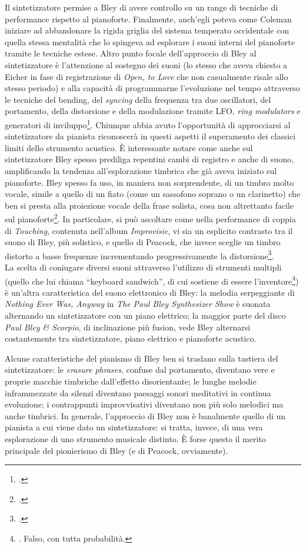 Il sintetizzatore permise a Bley di avere controllo su un range di tecniche di performance rispetto al pianoforte. Finalmente, anch'egli poteva come Coleman iniziare ad abbandonare la rigida griglia del sistema temperato occidentale con quella stessa mentalità che lo spingeva ad esplorare i suoni interni del pianoforte tramite le tecniche estese. Altro punto focale dell'approccio di Bley al sintetizzatore è l'attenzione al sostegno dei suoni (lo stesso che aveva chiesto a Eicher in fase di registrazione di \textit{Open, to Love} che non casualmente risale allo stesso periodo) e alla capacità di programmarne l'evoluzione nel tempo attraverso le tecniche del bending, del \textit{syncing} della frequenza tra due oscillatori, del portamento, della distorsione e della modulazione tramite LFO, \textit{ring modulators} e generatori di inviluppo\footcite[317]{gluck}. Chiunque abbia avuto l'opportunità di approcciarsi al sintetizzatore da pianista riconoscerà in questi aspetti il superamento dei classici limiti dello strumento acustico. È interessante notare come anche sul sintetizzatore Bley spesso prediliga repentini cambi di registro e anche di suono, amplificando la tendenza all'esplorazione timbrica che già aveva iniziato sul pianoforte. Bley spesso fa uso, in maniera non sorprendente, di un timbro molto vocale, simile a quello di un fiato (come un sassofono soprano o un clarinetto) che ben si presta alla proiezione vocale della frase solista, cosa non altrettanto facile sul pianoforte\footcite[317]{gluck}. In particolare, si può ascoltare come nella performance di coppia di \textit{Touching}, contenuta nell'album \textit{Improvisie}, vi sia un esplicito contrasto tra il suono di Bley, più solistico, e quello di Peacock, che invece sceglie un timbro distorto a basse frequenze incrementando progressivamente la distorsione\footcite[318]{gluck}.\\
La scelta di coniugare diversi suoni attraverso l'utilizzo di strumenti multipli (quello che lui chiama ``keyboard sandwich'', di cui sostiene di essere l'inventore\footnote{\cite[113]{stopping}. Falso, con tutta probabilità.}) è un'altra caratteristica del suono elettronico di Bley: la melodia serpeggiante di \textit{Nothing Ever Was, Anyway} in \textit{The Paul Bley Synthesizer Show} è suonata alternando un sintetizzatore con un piano elettrico; la maggior parte del disco \textit{Paul Bley \& Scorpio}, di inclinazione più fusion, vede Bley alternarsi costantemente tra sintetizzatore, piano elettrico e pianoforte acustico. \par
Alcune caratteristiche del pianismo di Bley ben si traslano sulla tastiera del sintetizzatore: le \textit{erasure phrases}, confuse dal portamento, diventano vere e proprie macchie timbriche dall'effetto disorientante; le lunghe melodie inframmezzate da silenzi diventano paesaggi sonori meditativi in continua evoluzione; i contrappunti improvvisativi diventano non più solo melodici ma anche timbrici. In generale, l'approccio di Bley non è banalmente quello di un pianista a cui viene dato un sintetizzatore: si tratta, invece, di una vera esplorazione di uno strumento musicale distinto. È forse questo il merito principale del pionierismo di Bley (e di Peacock, ovviamente).\par
